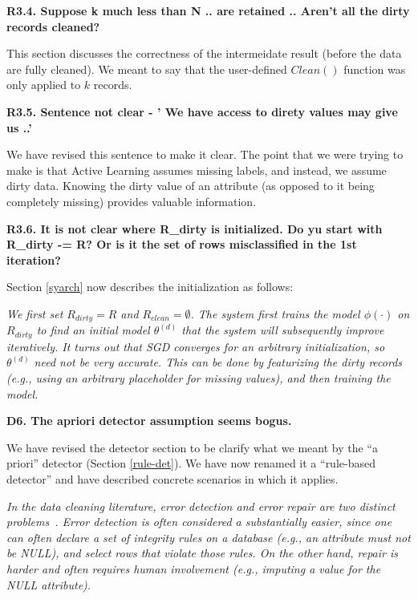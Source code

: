 \vspace{0.5em}

\noindent \textbf{R3.4. Suppose k much less than N .. are retained .. Aren't all
the dirty records cleaned?}

\noindent This section discusses the correctness of the intermeidate result (before the data are fully cleaned).
We meant to say that the user-defined $Clean()$ function was only applied to $k$ records.

\vspace{0.5em}

\noindent\textbf{R3.5. Sentence not clear - ' We have access to direty
values may give us ..'}

 \noindent We have revised this sentence to make it clear. The point that we were trying to make is that Active Learning assumes missing labels, and instead, we assume dirty data. Knowing the dirty value of an attribute (as opposed to it being completely missing) provides valuable information.

\vspace{0.5em}

\noindent\textbf{R3.6. It is not clear where R\_dirty is initialized. Do yu start with R\_dirty -= R? Or is it the set of rows misclassified in the 1st iteration?}

\noindent Section \ref{syarch} now describes the initialization as follows:

\emph{We first set $R_{dirty} = R$ and $R_{clean} = \emptyset$.
The system first trains the model $\phi(\cdot)$ on $R_{dirty}$ to find an initial model $\theta^{(d)}$ that the system will subsequently improve iteratively.
It turns out that SGD converges for an arbitrary initialization, so $\theta^{(d)}$ need not be very accurate. This can be done by featurizing the dirty records (e.g., using an arbitrary placeholder for missing values), and then training the model.}

\vspace{0.5em}

\noindent\textbf{D6. The apriori detector assumption seems bogus.} 

\noindent  We have revised the detector section to be clarify what we meant by the ``a priori'' detector (Section \ref{rule-det}). We have now renamed it a ``rule-based detector'' and have described concrete scenarios in which it applies.

\vspace{0.5em}

\emph{In the data cleaning literature, error detection and error repair are two distinct problems~\cite{DBLP:series/synthesis/2012Fan, Dasu:2003:EDM:861869, rahm2000data}.
Error detection is often considered a substantially easier, since one can often declare a set of integrity rules on a database (e.g., an attribute must not be NULL), and select rows that violate those rules.
On the other hand, repair is harder and often requires human involvement (e.g., imputing a value for the NULL attribute).}

